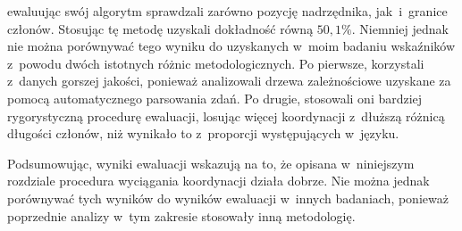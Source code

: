 \cite{przepiorkowski2024argument} ewaluując swój algorytm sprawdzali zarówno pozycję nadrzędnika, jak~i~granice członów. Stosując tę metodę uzyskali dokładność równą $50,1\%$. Niemniej jednak nie można porównywać tego wyniku do uzyskanych w~moim badaniu wskaźników z~powodu dwóch istotnych różnic metodologicznych. Po pierwsze, \cite{przepiorkowski2024argument} korzystali z~danych gorszej jakości, ponieważ analizowali drzewa zależnościowe uzyskane za pomocą automatycznego parsowania zdań. Po drugie, stosowali oni bardziej rygorystyczną procedurę ewaluacji, losując więcej koordynacji z~dłuższą różnicą długości członów, niż wynikało to z~proporcji występujących w~języku.

Podsumowując, wyniki ewaluacji wskazują na to, że opisana w~niniejszym rozdziale procedura wyciągania koordynacji działa dobrze. Nie można jednak porównywać tych wyników do wyników ewaluacji w~innych badaniach, ponieważ poprzednie analizy w~tym zakresie stosowały inną metodologię.